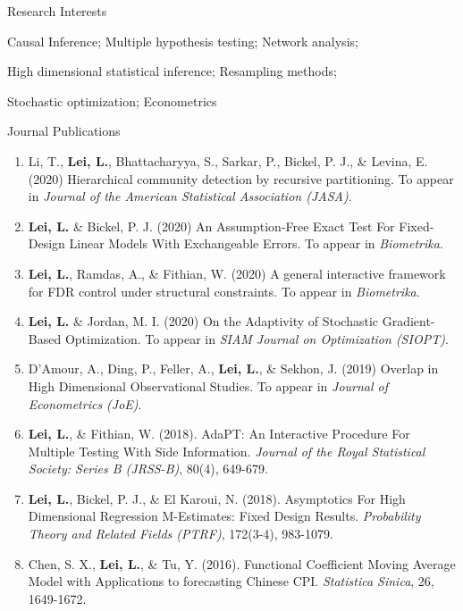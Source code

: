 \documentclass{article}
\begin{document}
\begin{large}
\noindent Research Interests
\end{large}

\vspace{3mm}
Causal Inference; Multiple hypothesis testing; Network analysis; 

High dimensional statistical inference; Resampling methods;

Stochastic optimization; Econometrics

\vspace{3mm}

\begin{large}
\noindent Journal Publications
\end{large}

\begin{enumerate}
\item Li, T., \textbf{Lei, L.}, Bhattacharyya, S., Sarkar, P., Bickel, P. J., \& Levina, E. (2020) Hierarchical community detection by recursive partitioning. To appear in \emph{Journal of the American Statistical Association (JASA)}.
\item \textbf{Lei, L.} \& Bickel, P. J. (2020) An Assumption-Free Exact Test For Fixed-Design Linear Models With Exchangeable Errors. To appear in \emph{Biometrika}.
\item \textbf{Lei, L.}, Ramdas, A., \& Fithian, W. (2020) A general interactive framework for FDR control under structural constraints. To appear in \emph{Biometrika}.
\item \textbf{Lei, L.} \& Jordan, M. I. (2020) On the Adaptivity of Stochastic Gradient-Based Optimization. To appear in \emph{SIAM Journal on Optimization (SIOPT)}.
\item D'Amour, A., Ding, P., Feller, A., \textbf{Lei, L.}, \& Sekhon, J. (2019) Overlap in High Dimensional Observational Studies. To appear in \emph{Journal of Econometrics (JoE)}.
\item \textbf{Lei, L.}, \& Fithian, W. (2018). AdaPT: An Interactive Procedure For Multiple Testing With Side Information. \emph{Journal of the Royal Statistical Society: Series B (JRSS-B)}, 80(4), 649-679.
\item \textbf{Lei, L.}, Bickel, P. J., \& El Karoui, N. (2018). Asymptotics For High Dimensional Regression M-Estimates: Fixed Design Results. \emph{Probability Theory and Related Fields (PTRF)}, 172(3-4), 983-1079.
\item Chen, S. X., \textbf{Lei, L.}, \& Tu, Y. (2016). Functional Coefficient Moving Average Model with Applications to forecasting Chinese CPI. \emph{Statistica Sinica}, 26, 1649-1672.
\end{enumerate}
\end{document}
